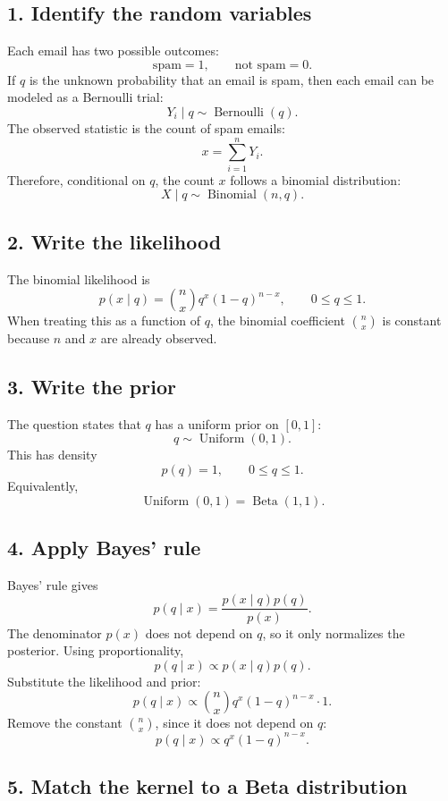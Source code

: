 \documentclass[11pt]{article}
\begin{document}
\subsection*{1. Identify the random variables}

Each email has two possible outcomes:
\[
    \text{spam} = 1, \qquad \text{not spam} = 0.
\]
If \(q\) is the unknown probability that an email is spam, then each email can be
modeled as a Bernoulli trial:
\[
    Y_i \mid q \sim \operatorname{Bernoulli}(q).
\]
The observed statistic is the count of spam emails:
\[
    x = \sum_{i=1}^{n} Y_i.
\]
Therefore, conditional on \(q\), the count \(x\) follows a binomial distribution:
\[
    X \mid q \sim \operatorname{Binomial}(n,q).
\]

\subsection*{2. Write the likelihood}

The binomial likelihood is
\[
    p(x \mid q)
    = \binom{n}{x} q^x(1-q)^{n-x},
    \qquad 0 \le q \le 1.
\]
When treating this as a function of \(q\), the binomial coefficient
\(\binom{n}{x}\) is constant because \(n\) and \(x\) are already observed.

\subsection*{3. Write the prior}

The question states that \(q\) has a uniform prior on \([0,1]\):
\[
    q \sim \operatorname{Uniform}(0,1).
\]
This has density
\[
    p(q) = 1, \qquad 0 \le q \le 1.
\]
Equivalently,
\[
    \operatorname{Uniform}(0,1) = \operatorname{Beta}(1,1).
\]

\subsection*{4. Apply Bayes' rule}

Bayes' rule gives
\[
    p(q \mid x)
    =
    \frac{p(x \mid q)p(q)}{p(x)}.
\]
The denominator \(p(x)\) does not depend on \(q\), so it only normalizes the
posterior. Using proportionality,
\[
    p(q \mid x)
    \propto
    p(x \mid q)p(q).
\]
Substitute the likelihood and prior:
\[
    p(q \mid x)
    \propto
    \binom{n}{x} q^x(1-q)^{n-x} \cdot 1.
\]
Remove the constant \(\binom{n}{x}\), since it does not depend on \(q\):
\[
    p(q \mid x)
    \propto
    q^x(1-q)^{n-x}.
\]

\subsection*{5. Match the kernel to a Beta distribution}
\end{document}
